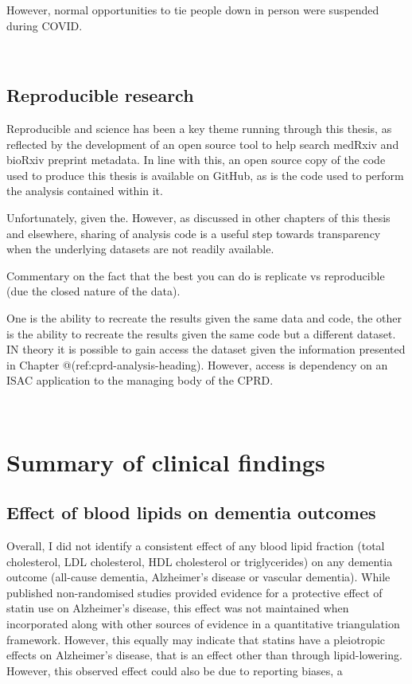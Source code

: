 \documentclass[a4paper, twoside]{templates/ociamthesis}
\begin{document}
However, normal opportunities to tie people down in person were suspended during COVID.

~

\newpage

\hypertarget{reproducible-research}{%
\subsection{Reproducible research}\label{reproducible-research}}

Reproducible and science has been a key theme running through this thesis, as reflected by the development of an open source tool to help search medRxiv and bioRxiv preprint metadata. In line with this, an open source copy of the code used to produce this thesis is available on GitHub, as is the code used to perform the analysis contained within it.

Unfortunately, given the. However, as discussed in other chapters of this thesis and elsewhere, sharing of analysis code is a useful step towards transparency when the underlying datasets are not readily available.

Commentary on the fact that the best you can do is replicate vs reproducible (due the closed nature of the data).

One is the ability to recreate the results given the same data and code, the other is the ability to recreate the results given the same code but a different dataset. IN theory it is possible to gain access the dataset given the information presented in Chapter @(ref:cprd-analysis-heading). However, access is dependency on an ISAC application to the managing body of the CPRD.

~

\newpage

\hypertarget{summary-of-clinical-findings}{%
\section{Summary of clinical findings}\label{summary-of-clinical-findings}}

\hypertarget{effect-of-blood-lipids-on-dementia-outcomes}{%
\subsection{Effect of blood lipids on dementia outcomes}\label{effect-of-blood-lipids-on-dementia-outcomes}}

Overall, I did not identify a consistent effect of any blood lipid fraction (total cholesterol, LDL cholesterol, HDL cholesterol or triglycerides) on any dementia outcome (all-cause dementia, Alzheimer's disease or vascular dementia).
While published non-randomised studies provided evidence for a protective effect of statin use on Alzheimer's disease, this effect was not maintained when incorporated along with other sources of evidence in a quantitative triangulation framework. However, this equally may indicate that statins have a pleiotropic effects on Alzheimer's disease, that is an effect other than through lipid-lowering. However, this observed effect could also be due to reporting biases, a
\end{document}
